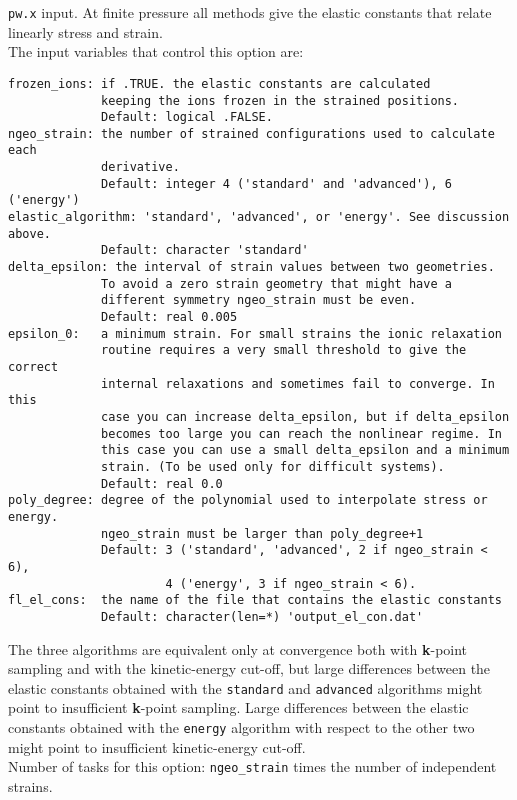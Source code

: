 \documentclass[12pt,a4paper]{article}
\begin{document}
\texttt{pw.x} input.
At finite pressure all methods give the elastic constants that
relate linearly stress and strain. \\
The input variables that control this option are:
\begin{verbatim}
frozen_ions: if .TRUE. the elastic constants are calculated 
             keeping the ions frozen in the strained positions. 
             Default: logical .FALSE.
ngeo_strain: the number of strained configurations used to calculate each
             derivative. 
             Default: integer 4 ('standard' and 'advanced'), 6 ('energy')
elastic_algorithm: 'standard', 'advanced', or 'energy'. See discussion above.
             Default: character 'standard' 
delta_epsilon: the interval of strain values between two geometries.
             To avoid a zero strain geometry that might have a
             different symmetry ngeo_strain must be even.
             Default: real 0.005
epsilon_0:   a minimum strain. For small strains the ionic relaxation 
             routine requires a very small threshold to give the correct 
             internal relaxations and sometimes fail to converge. In this 
             case you can increase delta_epsilon, but if delta_epsilon 
             becomes too large you can reach the nonlinear regime. In 
             this case you can use a small delta_epsilon and a minimum 
             strain. (To be used only for difficult systems).
             Default: real 0.0
poly_degree: degree of the polynomial used to interpolate stress or energy.
             ngeo_strain must be larger than poly_degree+1
             Default: 3 ('standard', 'advanced', 2 if ngeo_strain < 6), 
                      4 ('energy', 3 if ngeo_strain < 6).
fl_el_cons:  the name of the file that contains the elastic constants
             Default: character(len=*) 'output_el_con.dat'
\end{verbatim}
The three algorithms are equivalent only at convergence both with
{\bf k}-point sampling and with the kinetic-energy cut-off, but 
large differences between the elastic constants obtained with the 
\texttt{standard} and \texttt{advanced} algorithms might point to 
insufficient {\bf k}-point sampling. Large differences between the 
elastic constants obtained with the \texttt{energy} algorithm with respect 
to the other two might point to insufficient kinetic-energy cut-off. \\
Number of tasks for this option: \texttt{ngeo\_strain} times the number of
independent strains. \\
\end{document}
